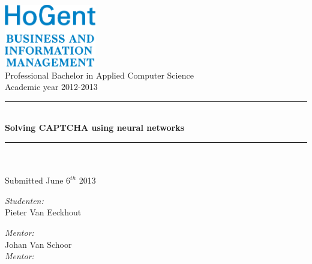\documentclass[pdftex,a4paper,12pt,twoside]{report}
\newcommand{\HRule}{\rule{\linewidth}{0.5mm}}
\theoremstyle{plain} \newtheorem{theorem}{Theorem} \newtheorem{proposition}{Proposition} \newtheorem{lemma}{Lemma} \newtheorem*{corollary}{Corollary}
\theoremstyle{definition} \newtheorem{definition}{Definition} \newtheorem{conjecture}{Conjecture} \newtheorem*{example}{Example} \newtheorem{algorithm}{Algorithm}
\theoremstyle{remark} \newtheorem*{remark}{Remark} \newtheorem*{note}{Note} \newtheorem{case}{Case}
\newcommand{\captchasp}{CAPTCHA }
\newcommand{\studenta}{Pieter {Van Eeckhout}}
\newcommand{\begeleider}{Johan {Van Schoor}}
\newcommand{\titel}{Solving \captchasp using neural networks}
\newcommand{\ondertitel}{}
\newcommand{\datum}{June $6^{th}$ 2013}
\newcommand{\academiejaar}{2012-2013}
\begin{document}

\begin{titlepage}
\begin{center}
\includegraphics[width=4cm]{./img/FBO-EN.png}\\[.5cm]




Professional Bachelor in Applied Computer Science\\
Academic year \academiejaar

\vfill

\HRule \\[0.4cm]
{ \huge \bfseries \titel}\\[0.4cm]
\HRule \\[0.4cm]

{\Large \ondertitel}\\[0.4cm]

Submitted \datum

\vfill

\begin{minipage}{0.49\textwidth}
\begin{flushleft}
\emph{Student\ifdefined\studentb en\fi :}\\
\studenta \\
\ifdefined\studentb \studentb \fi\par
\end{flushleft}
\end{minipage}
\begin{minipage}{0.49\textwidth}
\begin{flushright}
\emph{Mentor:}\\ \begeleider\\
\ifdefined\mentor \emph{Mentor:}\\ \mentor \fi
\end{flushright}
\end{minipage}

\end{center}

\end{titlepage}

\end{document}

